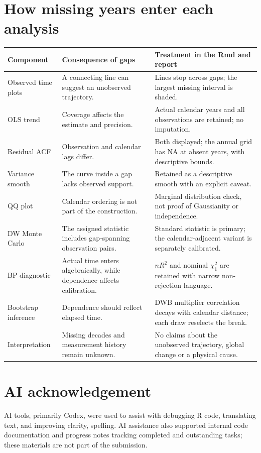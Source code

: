 \documentclass[11pt,a4paper]{article}
\begin{document}
\section{How missing years enter each analysis}\label{app:gaps}
\small
\begin{tabularx}{\linewidth}{@{}p{.20\linewidth}XX@{}}\toprule
Component & Consequence of gaps & Treatment in the Rmd and report\\\midrule
Observed time plots & A connecting line can suggest an unobserved trajectory. & Lines stop across gaps; the largest missing interval is shaded.\\
OLS trend & Coverage affects the estimate and precision. & Actual calendar years and all observations are retained; no imputation.\\
Residual ACF & Observation and calendar lags differ. & Both displayed; the annual grid has NA at absent years, with descriptive bounds.\\
Variance smooth & The curve inside a gap lacks observed support. & Retained as a descriptive smooth with an explicit caveat.\\
QQ plot & Calendar ordering is not part of the construction. & Marginal distribution check, not proof of Gaussianity or independence.\\
DW Monte Carlo & The assigned statistic includes gap-spanning observation pairs. & Standard statistic is primary; the calendar-adjacent variant is separately calibrated.\\
BP diagnostic & Actual time enters algebraically, while dependence affects calibration. & $nR^2$ and nominal $\chi^2_1$ are retained with narrow non-rejection language.\\
Bootstrap inference & Dependence should reflect elapsed time. & DWB multiplier correlation decays with calendar distance; each draw reselects the break.\\
Interpretation & Missing decades and measurement history remain unknown. & No claims about the unobserved trajectory, global change or a physical cause.\\\bottomrule
\end{tabularx}
\normalsize



\section*{AI acknowledgement}
{}
AI tools, primarily Codex, were used to assist with debugging R code, translating text, and improving clarity, spelling. AI assistance also supported internal code documentation and progress notes tracking completed and outstanding tasks; these materials are not part of the submission.
\end{document}
